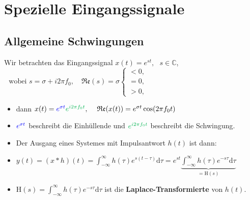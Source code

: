 \documentclass[11pt]{article}
\begin{document}
{\vfill \null
\pagebreak

\section*{Spezielle Eingangssignale}
\vspace*{-0.5cm}
\subsection*{Allgemeine Schwingungen}
\vspace*{-0.5cm}
Wir betrachten das Eingangssignal $x(t) = \displaystyle e^{st}, \hspace{8pt} s \in \mathbb{C}$,
$ \hspace{8pt} \text{wobei }s = \sigma + i 2 \pi f_0, \hspace{12pt} \mathfrak{Re}(s) = \sigma \begin{cases}
    < 0, \\
    = 0, \\
    > 0,
\end{cases}$
\begin{itemize}[leftmargin = 0pt]
    \item[] dann $x(t) = \textcolor{myblue}{e^{\sigma t}}\textcolor{mygreen}{e^{i 2 \pi f_0 t}}, \hspace{12pt} \mathfrak{Re}(x(t)) = e^{\sigma t}\cos (2\pi f_0 t)$
    \item[] $\textcolor{myblue}{e^{\sigma t}}$ beschreibt die \textcolor{myblue}{Einhüllende} und $\textcolor{mygreen}{e^{i 2 \pi f_0 t}}$ beschreibt die \textcolor{mygreen}{Schwingung}.
    \item[] Der Ausgang eines Systemes mit Impulsantwort $h(t)$ ist dann:
    \item[] $y(t) = (x \ast h)(t) = \displaystyle\int_{-\infty}^{\infty} h(\tau)e^{s(t-\tau)} \text{d}\tau = e^{st} \underbrace{\int_{-\infty}^{\infty} h(\tau) e^{-s\tau} \text{d}\tau}_{=\text{H}(s)}$
    \item[] $\text{H}(s) = \displaystyle\int_{-\infty}^{\infty} h(\tau) e^{-s\tau} \text{d}\tau$ ist die \textbf{Laplace-Transformierte} von $h(t)$.
\end{itemize}

\vspace*{-0.5cm}
}
\end{document}
